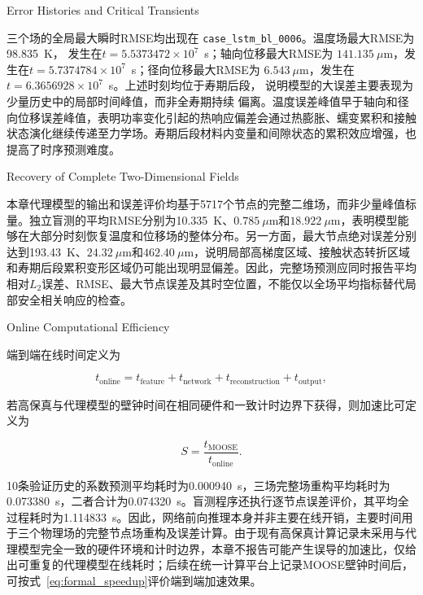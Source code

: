 {Error Histories and Critical Transients}

三个场的全局最大瞬时RMSE均出现在
\texttt{case\_lstm\_bl\_0006}。温度场最大RMSE为98.835~K，
发生在$t=5.5373472\times10^7$~s；轴向位移最大RMSE为
$141.135~\mu$m，发生在$t=5.7374784\times10^7$~s；径向位移最大RMSE为
$6.543~\mu$m，发生在$t=6.3656928\times10^7$~s。上述时刻均位于寿期后段，
说明模型的大误差主要表现为少量历史中的局部时间峰值，而非全寿期持续
偏离。温度误差峰值早于轴向和径向位移误差峰值，表明功率变化引起的热响应偏差会通过热膨胀、蠕变累积和接触状态演化继续传递至力学场。寿期后段材料内变量和间隙状态的累积效应增强，也提高了时序预测难度。

{Recovery of Complete Two-Dimensional Fields}

本章代理模型的输出和误差评价均基于5717个节点的完整二维场，而非少量峰值标量。独立盲测的平均RMSE分别为10.335~K、$0.785~\mu$m和$18.922~\mu$m，表明模型能够在大部分时刻恢复温度和位移场的整体分布。另一方面，最大节点绝对误差分别达到193.43~K、$24.32~\mu$m和$462.40~\mu$m，说明局部高梯度区域、接触状态转折区域和寿期后段累积变形区域仍可能出现明显偏差。因此，完整场预测应同时报告平均相对$L_2$误差、RMSE、最大节点误差及其时空位置，不能仅以全场平均指标替代局部安全相关响应的检查。

{Online Computational Efficiency}

端到端在线时间定义为

\begin{equation}
	t_{\mathrm{online}}
	=
	t_{\mathrm{feature}}
	+
	t_{\mathrm{network}}
	+
	t_{\mathrm{reconstruction}}
	+
	t_{\mathrm{output}},
	\label{eq:formal_online_time}
\end{equation}

若高保真与代理模型的壁钟时间在相同硬件和一致计时边界下获得，则加速比可定义为

\begin{equation}
	S
	=
	\frac{t_{\mathrm{MOOSE}}}{t_{\mathrm{online}}}.
	\label{eq:formal_speedup}
\end{equation}

10条验证历史的系数预测平均耗时为0.000940~s，三场完整场重构平均耗时为0.073380~s，二者合计为0.074320~s。盲测程序还执行逐节点误差评价，其平均全过程耗时为1.114833~s。因此，网络前向推理本身并非主要在线开销，主要时间用于三个物理场的完整节点场重构及误差计算。由于现有高保真计算记录未采用与代理模型完全一致的硬件环境和计时边界，本章不报告可能产生误导的加速比，仅给出可重复的代理模型在线耗时；后续在统一计算平台上记录MOOSE壁钟时间后，可按式~\eqref{eq:formal_speedup}评价端到端加速效果。

